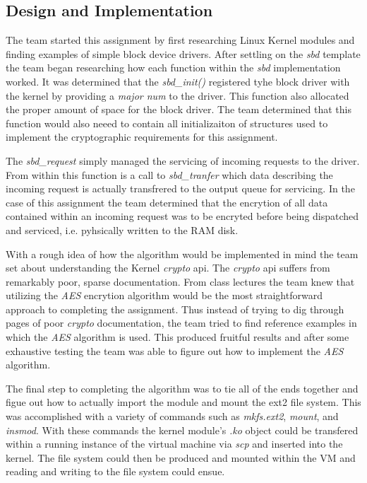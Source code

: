 \documentclass[10pt,onecolumn,draftclsnofoot]{IEEEtran} %
\begin{document}
\newpage
\begin{singlespace}
\section{\bf  Design and Implementation}

  \normalfont \indent The team started this assignment by first researching Linux Kernel modules and finding examples of simple block device drivers. After settling on the \textit{sbd} template the team began researching how each function within the \textit{sbd} implementation worked. It was determined that the \textit{sbd\_init()} registered tyhe block driver with the kernel by providing a \textit{major num} to the driver. This function also allocated the proper amount of space for the block driver. The team determined that this function would also neeed to contain all initializaiton of structures used to implement the cryptographic requirements for this assignment.

  \normalfont \indent The \textit{sbd\_request} simply managed the servicing of incoming requests to the driver. From within this function is a call to \textit{sbd\_tranfer} which data describing the incoming request is actually transfrered to the output queue for servicing. In the case of this assignment the team determined that the encrytion of all data contained within an incoming request was to be encryted before being dispatched and serviced, i.e. pyhsically written to the RAM disk. 


   \normalfont \indent With a rough idea of how the algorithm would be implemented in mind the team set about understanding the Kernel \textit{crypto} api. The \textit{crypto} api suffers from remarkably poor, sparse documentation. From class lectures the team knew that utilizing the \textit{AES} encrytion algorithm would be the most straightforward approach to completing the assignment. Thus instead of trying to dig through pages of poor \textit{crypto} documentation, the team tried to find reference examples in which the \textit{AES} algorithm is used. This produced fruitful results and after some exhaustive testing the team was able to figure out how to implement the \textit{AES} algorithm.  

   \normalfont \indent The final step to completing the algorithm was to tie all of the ends together and figue out how to actually import the module and mount the ext2 file system. This was accomplished with a variety of commands such as \textit{mkfs.ext2}, \textit{mount}, and \textit{insmod}. With these commands the kernel module's \textit{.ko} object could be transfered within a running instance of the virtual machine via \textit{scp} and inserted into the kernel. The file system could then be produced and mounted within the VM and reading and writing to the file system could ensue. 


\end{singlespace}
\end{document}
